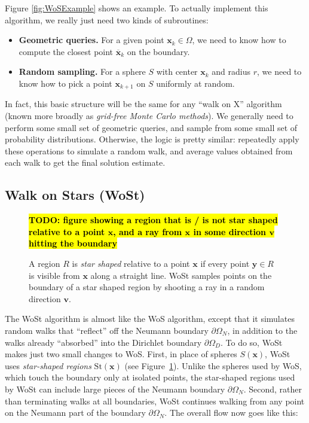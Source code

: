\documentclass{article}
\newcommand{\todo}[1]{\textbf{\hl{TODO: #1}}}
\newcommand{\St}{\text{St}}
\renewcommand{\vec}[1]{\textbf{#1}}
\begin{document}
Figure \ref{fig:WoSExample} shows an example.  To actually implement this algorithm, we really just need two kinds of subroutines:
\begin{itemize}
   \item \textbf{Geometric queries.}  For a given point \(\vec{x}_k \in \Omega\), we need to know how to compute the closest point \(\overline{\vec{x}}_k\) on the boundary.
   \item \textbf{Random sampling.} For a sphere \(S\) with center \(\vec{x}_k\) and radius \(r\), we need to know how to pick a point \(\vec{x}_{k+1}\) on \(S\) uniformly at random.
\end{itemize}

In fact, this basic structure will be the same for any ``walk on X'' algorithm (known more broadly as \emph{grid-free Monte Carlo methods}).  We generally need to perform some small set of geometric queries, and sample from some small set of probability distributions.  Otherwise, the logic is pretty similar: repeatedly apply these operations to simulate a random walk, and average values obtained from each walk to get the final solution estimate.

\subsection{Walk on Stars (WoSt)}
\label{sec:WalkOnStarsOverview}

\begin{figure}[h!]
   \todo{figure showing a region that is / is not star shaped relative to a point $\vec{x}$, and a ray from $\vec{x}$ in some direction $\vec{v}$ hitting the boundary} 
   \caption{A region \(R\) is \emph{star shaped} relative to a point \(\vec{x}\) if every point \(\vec{y} \in R\) is visible from \(\vec{x}\) along a straight line.  WoSt samples points on the boundary of a star shaped region by shooting a ray in a random direction \(\vec{v}\).\label{fig:StarShapedRegions}}
\end{figure}

The WoSt algorithm is almost like the WoS algorithm, except that it simulates random walks that ``reflect'' off the Neumann boundary \(\partial\Omega_N\), in addition to the walks already ``absorbed'' into the Dirichlet boundary \(\partial\Omega_D\).  To do so, WoSt makes just two small changes to WoS.  First, in place of spheres \(S(\vec{x})\), WoSt uses \emph{star-shaped regions} \(\St(\vec{x})\) (see Figure~\ref{fig:StarShapedRegions}).  Unlike the spheres used by WoS, which touch the boundary only at isolated points, the star-shaped regions used by WoSt can include large pieces of the Neumann boundary \(\partial\Omega_N\).  Second, rather than terminating walks at all boundaries, WoSt continues walking from any point on the Neumann part of the boundary \(\partial\Omega_N\).  The overall flow now goes like this:
\end{document}
